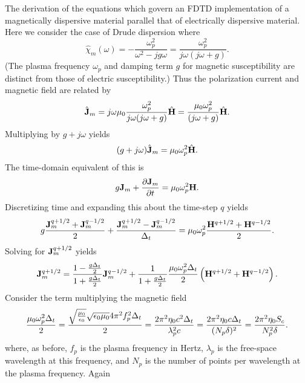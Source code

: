 The derivation of the equations which govern an FDTD implementation of
a magnetically dispersive material parallel that of electrically
dispersive material.  Here we consider the case of Drude dispersion
where
\begin{equation}
  \hat{\chi}_m(\omega) = -\frac{\omega_p^2}{\omega^2 -jg\omega}
  =  \frac{\omega_p^2}{j\omega(j\omega + g)}.
\end{equation}
(The plasma frequency $\omega_p$ and damping term $g$ for magnetic
susceptibility are distinct from those of electric susceptibility.)
Thus the polarization current and magnetic field are related by
\begin{equation}
  \hat{\mathbf{J}}_m = j\omega\mu_0\frac{\omega_p^2}{j\omega(j\omega + g)}\hat{\mathbf{H}}
  = \frac{\mu_0\omega_p^2}{(j\omega + g)}\hat{\mathbf{H}}.
\end{equation}
Multiplying by $g+j\omega$ yields
\begin{equation}
  (g+j\omega)\hat{\mathbf{J}}_m = \mu_0\omega_p^2\hat{\mathbf{H}}.
\end{equation}
The time-domain equivalent of this is
\begin{equation}
  g\mathbf{J}_m+\frac{\partial\mathbf{J}_m}{\partial t} = \mu_0\omega_p^2\mathbf{H}.
\end{equation}
Discretizing time and expanding this about the time-step $q$ yields
\begin{equation}
  g\frac{\mathbf{J}_m^{q+1/2}+\mathbf{J}_m^{q-1/2}}{2}
  +\frac{\mathbf{J}_m^{q+1/2}-\mathbf{J}_m^{q-1/2}}{\Delta_t} = 
  \mu_0\omega_p^2\frac{\mathbf{H}^{q+1/2}+\mathbf{H}^{q-1/2}}{2}.
\end{equation}
Solving for $\mathbf{J}_m^{q+1/2}$ yields
\begin{equation}
  \mathbf{J}_m^{q+1/2} = \frac{1-\frac{g\Delta_t}{2}}{1+\frac{g\Delta_t}{2}}\mathbf{J}_m^{q-1/2}
  + \frac{1}{1+\frac{g\Delta_t}{2}}
   \frac{\mu_0\omega_p^2\Delta_t}{2}\left(\mathbf{H}^{q+1/2}+\mathbf{H}^{q-1/2}\right).
  \label{eq:jmUpdateDrude}
\end{equation}
Consider the term multiplying the magnetic field
\begin{equation}
  \frac{\mu_0\omega_p^2\Delta_t}{2} = 
  \frac{\sqrt{\frac{\mu_0}{\epsilon_0}}
        \sqrt{\epsilon_0\mu_0}4 \pi^2 f_p^2 \Delta_t}{2} = 
  \frac{2\pi^2 \eta_0 c^2 \Delta_t}{\lambda_p^2c} =
  \frac{2\pi^2 \eta_0 c \Delta_t}{(N_p\delta)^2} = 
  \frac{2\pi^2 \eta_0 S_c}{N_p^2 \delta}.
  \label{eq:coefficientDrudeM}
\end{equation}
where, as before, $f_p$ is the plasma frequency in Hertz, $\lambda_p$
is the free-space wavelength at this frequency, and $N_p$ is the
number of points per wavelength at the plasma frequency.  Again
